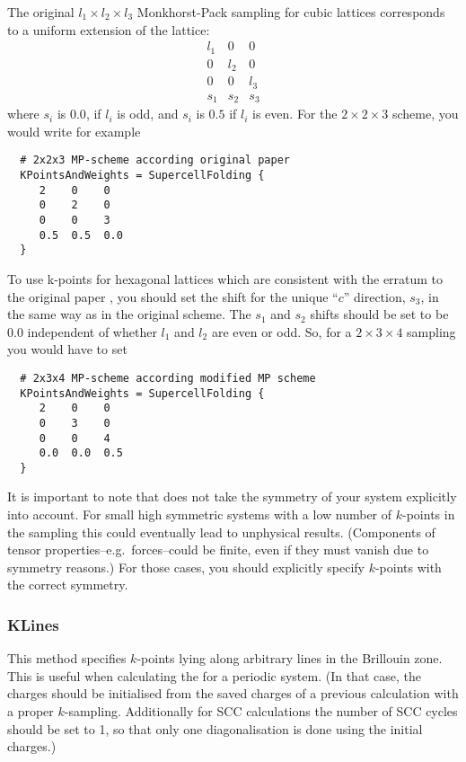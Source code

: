 The original $l_1\times l_2\times l_3$ Monkhorst-Pack
sampling \cite{monkhorst-prb-13-5188} for
cubic lattices corresponds to a uniform extension of the lattice:
\begin{equation*}
  \begin{array}{ccc}
    l_1 & 0 & 0\\
    0 & l_2 & 0 \\
    0 & 0& l_3 \\
    s_1 & s_2 & s_3
  \end{array}
\end{equation*}
where $s_i$ is $0.0$, if $l_i$ is odd, and $s_i$ is $0.5$ if $l_i$ is
even. For the $2\times2\times3$ scheme, you would write for example
\begin{verbatim}
  # 2x2x3 MP-scheme according original paper
  KPointsAndWeights = SupercellFolding {
     2    0    0
     0    2    0
     0    0    3
     0.5  0.5  0.0
  }
\end{verbatim}

To use k-points for hexagonal lattices which are consistent with the
erratum to the original paper \cite{monkhorst-prb-16-1748}, you should
set the shift for the unique ``$c$'' direction, $s_3$, in the same way
as in the original scheme. The $s_1$ and $s_2$ shifts should be set to
be $0.0$ independent of whether $l_1$ and $l_2$ are even or odd.  So,
for a $2\times3\times4$ sampling you would have to set
\begin{verbatim}
  # 2x3x4 MP-scheme according modified MP scheme
  KPointsAndWeights = SupercellFolding {
     2    0    0
     0    3    0
     0    0    4
     0.0  0.0  0.5
  }
\end{verbatim}

It is important to note that \dftbp{} does not take the symmetry of
your system explicitly into account. For small high symmetric systems
with a low number of $k$-points in the sampling this could eventually
lead to unphysical results. (Components of tensor
properties--e.g.\ forces--could be finite, even if they must vanish
due to symmetry reasons.) For those cases, you should explicitly
specify $k$-points with the correct symmetry.


\subsubsection{KLines\cb}
\label{sec:dftbp.KLines}

This method specifies $k$-points lying along arbitrary lines in the
Brillouin zone. This is useful when calculating the  for a periodic system. (In
that case, the charges should be initialised from the saved charges of
a previous calculation with a proper $k$-sampling. Additionally for
SCC calculations the number of SCC cycles should be set to 1, so that
only one diagonalisation is done using the initial charges.)

